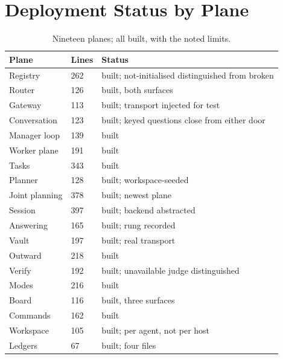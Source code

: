 \documentclass[11pt]{article}
\begin{document}
\section{Deployment Status by Plane}
\label{app:status}

\begin{table}[h]
\centering\small
\caption{Nineteen planes; all built, with the noted limits.}
\label{tab:status}
\begin{tabular}{@{}L{3.4cm}L{1.6cm}L{8.4cm}@{}}
\toprule
\textbf{Plane} & \textbf{Lines} & \textbf{Status} \\
\midrule
Registry & 262 & built; not-initialised distinguished from broken \\
Router & 126 & built, both surfaces \\
Gateway & 113 & built; transport injected for test \\
Conversation & 123 & built; keyed questions close from either door \\
Manager loop & 139 & built \\
Worker plane & 191 & built \\
Tasks & 343 & built \\
Planner & 128 & built; workspace-seeded \\
Joint planning & 378 & built; newest plane \\
Session & 397 & built; backend abstracted \\
Answering & 165 & built; rung recorded \\
Vault & 197 & built; real transport \\
Outward & 218 & built \\
Verify & 192 & built; unavailable judge distinguished \\
Modes & 216 & built \\
Board & 116 & built, three surfaces \\
Commands & 162 & built \\
Workspace & 105 & built; per agent, not per host \\
Ledgers & 67 & built; four files \\
\bottomrule
\end{tabular}
\end{table}



\end{document}
